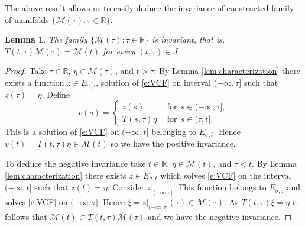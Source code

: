 \documentclass[a4paper,11pt,reqno]{amsart}
\theoremstyle{plain}
\newtheorem{lem}{Lemma}[section]
\theoremstyle{definition}
\numberwithin{equation}{section}
\newcommand{\R}{\mathbb{R}}
\newcommand{\calm}{\mathcal M}
\begin{document}
The above result allows us to easily deduce the invariance of constructed family of manifolds $\{\calm(\tau)\colon \tau\in \R \}$. 

\begin{lem}\label{lem:invariance}
The family $\{\calm(\tau)\colon \tau\in \R \}$ is invariant, that is, $T(t,\tau)\calm(\tau) = \calm(t)$ for every $(t,\tau)\in J$. 
\end{lem}
\begin{proof}
    Take $\tau\in \R$, $\eta \in \calm(\tau)$, and  $t>\tau$. By Lemma \ref{lem:characterization} there exists a function $z\in E_{\sigma,\tau}$, solution of \eqref{e:VCF} on interval $(-\infty,\tau]$ such that $z(\tau) = \eta$. Define
    $$
    v(s) = \begin{cases}
        z(s)\ \ & \text{for}\ \ s\in (-\infty,\tau],\\
        T(s,\tau) \eta\ \ &\textrm{for}\ \ s\in (\tau,t].
    \end{cases}
    $$
    This is a solution of \eqref{e:VCF} on $(-\infty,t]$ belonging to $E_{\sigma,t}$. Hence $v(t)=T(t,\tau)\eta\in \calm(t)$ {so} we have the positive invariance.

    To deduce the negative invariance take $t\in \R$, $\eta \in \calm(t)$, and $\tau<t$. By Lemma \ref{lem:characterization} there exists $z\in E_{\sigma,t}$ which solves  \eqref{e:VCF} on the interval $(-\infty,t]$ such that $z(t)=\eta$. Consider $z|_{(-\infty,\tau]}$. This function belongs to $E_{\sigma,\tau}$ and solves 
\eqref{e:VCF} on $(-\infty,\tau]$. Hence $\xi = z|_{(-\infty,\tau]}(\tau) \in \calm(\tau)$. As $T(t,\tau)\xi = \eta$ it follows that $\calm(t)\subset T(t,\tau)\calm(\tau)$  and we have the negative invariance.
\end{proof}
\end{document}
